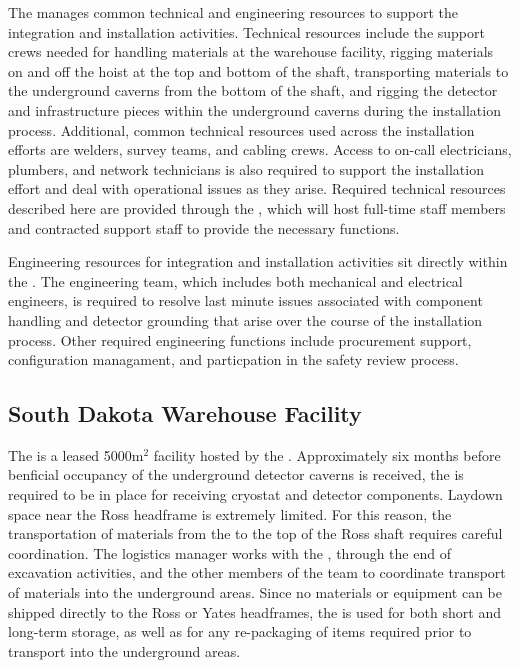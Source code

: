 The  manages common technical and engineering resources 
to support the integration and installation activities.  Technical
resources include the support crews needed for handling materials 
at the warehouse facility, rigging materials on and off the hoist 
at the top and bottom of the shaft, transporting materials to the
underground caverns from the bottom of the shaft, and rigging the 
detector and infrastructure pieces within the underground caverns 
during the installation process.  Additional, common technical 
resources used across the installation efforts are welders, 
survey teams, and cabling crews.  Access to on-call electricians, 
plumbers, and network technicians is also required to support 
the installation effort and deal with operational issues as they 
arise.  Required technical resources described here are provided 
through the , which will host full-time staff members 
and contracted support staff to provide the necessary functions.     

Engineering resources for integration and installation activities 
sit directly within the .  The engineering team, which 
includes both mechanical and electrical engineers, is required to 
resolve last minute issues associated with component handling and 
detector grounding that arise over the course of the installation 
process.  Other required engineering functions include procurement
support, configuration managament, and particpation in the safety 
review process.

\subsection{South Dakota Warehouse Facility}

The  is a leased 5000m$^2$ facility hosted by the
.  Approximately six months before benficial occupancy 
of the underground detector caverns is received, the  
is required to be in place for receiving cryostat and detector 
components.  Laydown space near the Ross headframe is extremely 
limited.  For this reason, the transportation of materials from 
the  to the top of the Ross shaft requires careful 
coordination. The  logistics manager works with 
the , through the end of excavation activities, and 
the other members of the  team to coordinate transport 
of materials into the underground areas.  Since no materials or 
equipment can be shipped directly to the Ross or Yates headframes, 
the  is used for both short and long-term storage, as 
well as for any re-packaging of items required prior to transport 
into the underground areas. 

